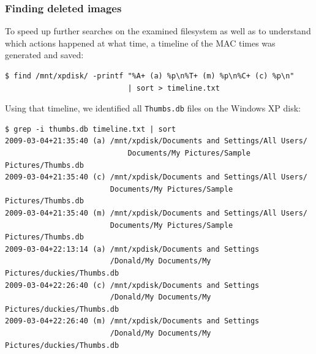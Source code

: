 \documentclass[a4paper,
    11pt,
    normalheadings,
    parindent,
    UKenglish,
    abstracton,
    ]{scrartcl}
\begin{document}
\subsubsection{Finding deleted images}
To speed up further searches on the examined filesystem as well as to understand which actions happened at what time, a timeline of the MAC times was generated and saved:
\begin{verbatim}
$ find /mnt/xpdisk/ -printf "%A+ (a) %p\n%T+ (m) %p\n%C+ (c) %p\n"
                            | sort > timeline.txt
\end{verbatim}

Using that timeline, we identified all \texttt{Thumbs.db} files on the Windows XP disk:
\begin{verbatim}
$ grep -i thumbs.db timeline.txt | sort
2009-03-04+21:35:40 (a) /mnt/xpdisk/Documents and Settings/All Users/
                            Documents/My Pictures/Sample Pictures/Thumbs.db
2009-03-04+21:35:40 (c) /mnt/xpdisk/Documents and Settings/All Users/
                        Documents/My Pictures/Sample Pictures/Thumbs.db
2009-03-04+21:35:40 (m) /mnt/xpdisk/Documents and Settings/All Users/
                        Documents/My Pictures/Sample Pictures/Thumbs.db
2009-03-04+22:13:14 (a) /mnt/xpdisk/Documents and Settings
                        /Donald/My Documents/My Pictures/duckies/Thumbs.db
2009-03-04+22:26:40 (c) /mnt/xpdisk/Documents and Settings
                        /Donald/My Documents/My Pictures/duckies/Thumbs.db
2009-03-04+22:26:40 (m) /mnt/xpdisk/Documents and Settings
                        /Donald/My Documents/My Pictures/duckies/Thumbs.db
\end{verbatim}
\end{document}
